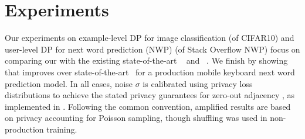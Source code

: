 \documentclass{article}
\begin{document}
\section{Experiments}\label{sec:experiments}
Our experiments on example-level DP for image classification (of CIFAR10) and user-level DP for next word prediction (NWP) (of Stack Overflow NWP) focus on comparing our \BANDMF with the existing state-of-the-art \memf~\cite{choquette2022multi} and \dpsgd~\cite{DP-DL}. %
We finish by showing that \BANDMF improves over state-of-the-art~\cite{kairouz2021practical} for a production mobile keyboard next word prediction model. 
In all cases, noise $\sigma$ is calibrated using privacy loss distributions \cite{koskela2020tight} to achieve the stated privacy guarantees for zero-out adjacency \citep{kairouz2021practical,ponomareva2023dpfy}, as implemented in \citep{pldlib}. Following the common convention, amplified results are based on privacy accounting for Poisson sampling, though shuffling was used in non-production training.



\end{document}

